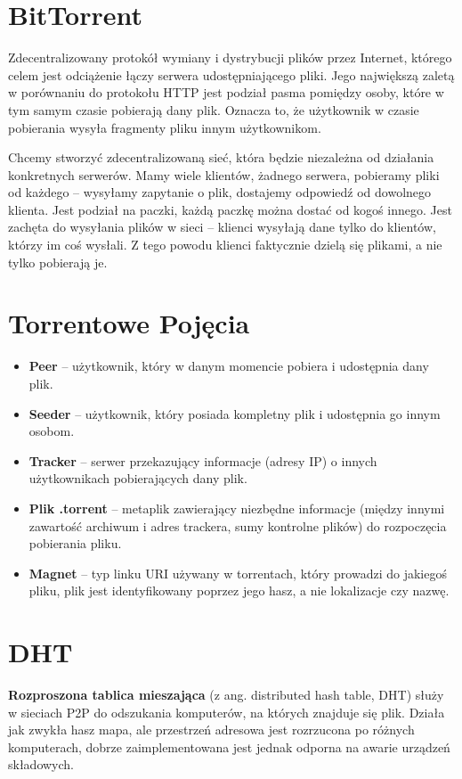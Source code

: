 \section{BitTorrent}
Zdecentralizowany protokół wymiany i dystrybucji plików przez Internet, którego celem jest odciążenie łączy serwera udostępniającego pliki. Jego największą zaletą w porównaniu do protokołu HTTP jest podział pasma pomiędzy osoby, które w tym samym czasie pobierają dany plik. Oznacza to, że użytkownik w czasie pobierania wysyła fragmenty pliku innym użytkownikom.

Chcemy stworzyć zdecentralizowaną sieć, która będzie niezależna od działania konkretnych serwerów. Mamy wiele klientów, żadnego serwera, pobieramy pliki od każdego -- wysyłamy zapytanie o plik, dostajemy odpowiedź od dowolnego klienta. Jest podział na paczki, każdą paczkę można dostać od kogoś innego. Jest zachęta do wysyłania plików w sieci -- klienci wysyłają dane tylko do klientów, którzy im coś wysłali. Z tego powodu klienci faktycznie dzielą się plikami, a nie tylko pobierają je.

\section{Torrentowe Pojęcia}
\begin{itemize}
	\item \textbf{Peer} -- użytkownik, który w danym momencie pobiera i udostępnia dany plik.
	\item \textbf{Seeder} -- użytkownik, który posiada kompletny plik i udostępnia go innym osobom.
	\item \textbf{Tracker} -- serwer przekazujący informacje (adresy IP) o innych użytkownikach pobierających dany plik.
	\item \textbf{Plik .torrent} -- metaplik zawierający niezbędne informacje (między innymi zawartość archiwum i adres trackera, sumy kontrolne plików) do rozpoczęcia pobierania pliku.
	\item \textbf{Magnet} -- typ linku URI używany w torrentach, który prowadzi do jakiegoś pliku, plik jest identyfikowany poprzez jego hasz, a nie lokalizacje czy nazwę.
\end{itemize}

\section{DHT}
\textbf{Rozproszona tablica mieszająca} (z ang. distributed hash table, DHT) służy w sieciach P2P do odszukania komputerów, na których znajduje się plik. Działa jak zwykła hasz mapa, ale przestrzeń adresowa jest rozrzucona po różnych komputerach, dobrze zaimplementowana jest jednak odporna na awarie urządzeń składowych.

